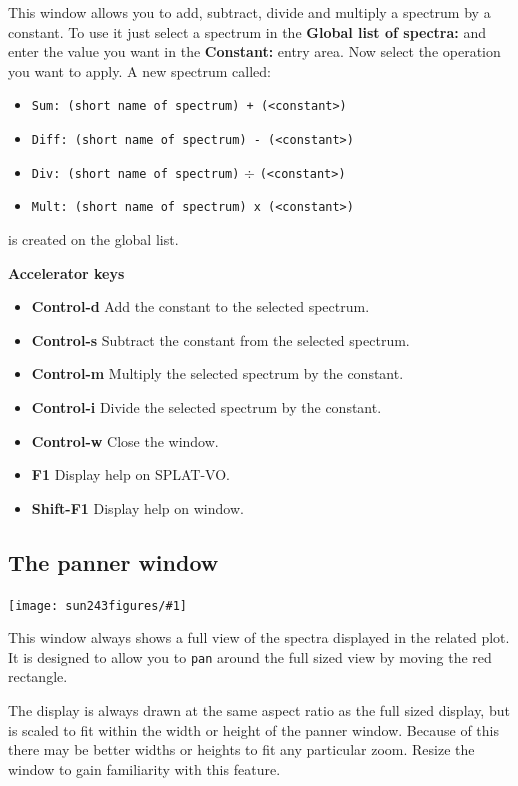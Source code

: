 \documentclass[twoside,11pt]{article}
\newcommand{\htmladdimg}[1]{}
\newcommand{\latexhtml}[2]{#1}
\renewcommand{\_}{\texttt{\symbol{95}}}
\newcommand{\SPLAT}{\textsf{SPLAT-VO}}
\newcommand{\mainfigure}[1]
{\begin{center}
 \latexhtml{\texttt{[image: sun243\_figures/\#1]}}{\htmladdimg{#1.gif}}
 \end{center}
}
\newcommand{\labelitem}[1]{\textbf{#1}}
\newcommand{\hitext}[1]{\texttt{#1}}
\newcommand{\subheading}[1]{\textbf{\large{#1}}}
\begin{document}
This window allows you to add, subtract, divide and multiply a
spectrum by a constant. To use it just select a spectrum in the
\labelitem{Global list of spectra:} and enter the value you want in
the \labelitem{Constant:} entry area.
Now select the operation you want to apply. A new spectrum called:
\begin{itemize}
  \item \hitext{Sum: (short name of spectrum) + (<constant>)}
  \item \hitext{Diff: (short name of spectrum) - (<constant>)}
  \item \hitext{Div: (short name of spectrum)} $\div$ \hitext{(<constant>)}
  \item \hitext{Mult: (short name of spectrum) x (<constant>)}
\end{itemize}
is created on the global list.

\subheading{Accelerator keys}

\begin{itemize}
\item \labelitem{Control-d} Add the constant to the selected spectrum.
\item \labelitem{Control-s} Subtract the constant from the selected spectrum.
\item \labelitem{Control-m} Multiply the selected spectrum by the constant.
\item \labelitem{Control-i} Divide the selected spectrum by the constant.
\item \labelitem{Control-w} Close the window.
\item \labelitem{F1} Display help on \SPLAT.
\item \labelitem{Shift-F1} Display help on window.
\end{itemize}

\newpage
\subsection{The panner window}

\mainfigure{pannerwindow}

This window always shows a full view of the spectra displayed in
the related plot. It is designed to allow you to \hitext{pan} around
the full sized view by moving the red rectangle.

The display is always drawn at the same aspect ratio as the full sized
display, but is scaled to fit within the width or height of the panner
window. Because of this there may be better widths or heights to fit
any particular zoom. Resize the window to gain familiarity with this
feature.
\end{document}
